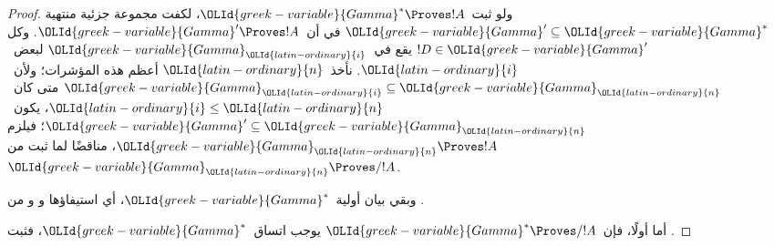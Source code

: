 \documentclass[../../../include/open-logic-section]{subfiles}
\begin{document}
\begin{proof}
  ولو ثبت~$\OLId{greek-variable}{Gamma}^* \Proves !A$، لكفت مجموعة جزئية منتهية
  $\OLId{greek-variable}{Gamma}'\subseteq\OLId{greek-variable}{Gamma}^*$ في أن~$\OLId{greek-variable}{Gamma}'\Proves !A$. وكل
  $!D\in\OLId{greek-variable}{Gamma}'$ يقع في~$\OLId{greek-variable}{Gamma}_\OLId{latin-ordinary}{i}$ لبعض~$\OLId{latin-ordinary}{i}$. نأخذ~$\OLId{latin-ordinary}{n}$ أعظم
  هذه المؤشرات؛ ولأن~$\OLId{greek-variable}{Gamma}_\OLId{latin-ordinary}{i}\subseteq\OLId{greek-variable}{Gamma}_\OLId{latin-ordinary}{n}$ متى كان~$\OLId{latin-ordinary}{i}\leq \OLId{latin-ordinary}{n}$،
  يكون~$\OLId{greek-variable}{Gamma}'\subseteq\OLId{greek-variable}{Gamma}_\OLId{latin-ordinary}{n}$؛ فيلزم
  $\OLId{greek-variable}{Gamma}_\OLId{latin-ordinary}{n}\Proves !A$، مناقضًا لما ثبت من
  $\OLId{greek-variable}{Gamma}_\OLId{latin-ordinary}{n}\Proves/!A$.

  وبقي بيان أولية~$\OLId{greek-variable}{Gamma}^*$، أي استيفاؤها
   و و من
  .

  أما أولًا، فإن~$\OLId{greek-variable}{Gamma}^*\Proves/!A$ يوجب اتساق~$\OLId{greek-variable}{Gamma}^*$، فثبت
  .


\end{proof}
\end{document}
